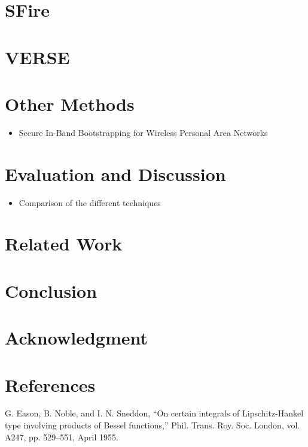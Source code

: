 \documentclass[conference]{IEEEtran}
\begin{document}
\section{SFire}

\section{VERSE}

\section{Other Methods}
\begin{itemize}
    \item Secure In-Band Bootstrapping for Wireless Personal Area Networks 
\end{itemize}
\section{Evaluation and Discussion}

\begin{itemize}
    \item Comparison of the different techniques
\end{itemize}

\section{Related Work}

\section{Conclusion}

\section*{Acknowledgment}

\section*{References}


\begin{thebibliography}{00}
 G. Eason, B. Noble, and I. N. Sneddon, ``On certain integrals of Lipschitz-Hankel type involving products of Bessel functions,'' Phil. Trans. Roy. Soc. London, vol. A247, pp. 529--551, April 1955.
\end{thebibliography}
\end{document}

